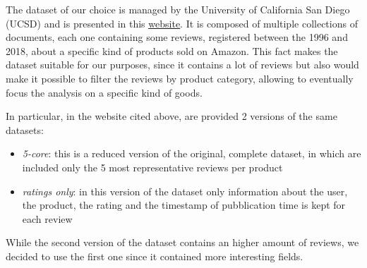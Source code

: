 The dataset of our choice is managed by the University of California San Diego (UCSD) and is presented in this \href{https://nijianmo.github.io/amazon/index.html}{\color{blue}\underline{website}}.
It is composed of multiple collections of documents, each one containing some reviews, registered between the 1996 and 2018, about a specific kind of products sold on Amazon. 
This fact makes the dataset suitable for our purposes, since it contains a lot of reviews but also would make it possible to filter the reviews by product category, allowing to eventually focus the analysis on a specific kind of goods.

In particular, in the website cited above, are provided 2 versions of the same datasets:
\begin{itemize}
    \item \textit{5-core}: this is a reduced version of the original, complete dataset, in which are included only the 5 most representative reviews per product
    \item \textit{ratings only}: in this version of the dataset only information about the user, the product, the rating and the timestamp of pubblication time is kept for each review
\end{itemize}
While the second version of the dataset contains an higher amount of reviews, we decided to use the first one since it contained more interesting fields.

